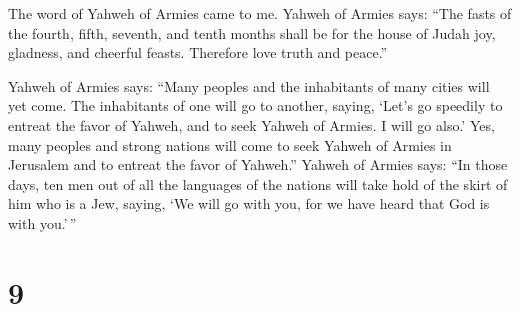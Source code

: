  The word of Yahweh of Armies came to me. 
Yahweh of Armies says: ``The fasts of the fourth, fifth, seventh, and
tenth months shall be for the house of Judah joy, gladness, and cheerful
feasts. Therefore love truth and peace.''

 Yahweh of Armies says: ``Many peoples and the inhabitants
of many cities will yet come.  The inhabitants of one will
go to another, saying, `Let's go speedily to entreat the favor of
Yahweh, and to seek Yahweh of Armies. I will go also.' 
Yes, many peoples and strong nations will come to seek Yahweh of Armies
in Jerusalem and to entreat the favor of Yahweh.''  Yahweh
of Armies says: ``In those days, ten men out of all the languages of the
nations will take hold of the skirt of him who is a Jew, saying, `We
will go with you, for we have heard that God is with you.'\,''

\hypertarget{section-8}{%
\section{9}\label{section-8}}

